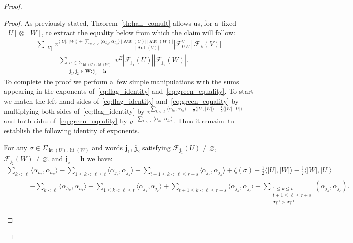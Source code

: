 \begin{proof}
\begin{proof}
As previously stated, Theorem~\ref{th:hall_comult} allows us, for a~f\/ixed $[U]\otimes[W]$, to extract the equality below
from which the claim will follow:
\begin{gather}
\sum\limits_{[V]}v^{\langle|U|,|W|\rangle+\sum\limits_{k<\ell}\langle\alpha_{h_k},\alpha_{h_\ell}\rangle}
\frac{|\operatorname{Aut}(U)||\operatorname{Aut}(W)|}{|\operatorname{Aut}(V)|}|\mathcal{F}^V_{UW}||\mathcal{F}_\mathbf{h}(V)|
\nonumber
\\
\qquad
=\sum\limits_{\substack{\sigma\in\Sigma_{\operatorname{ht}(U),\operatorname{ht}(W)}\\
\mathbf{j}_1,\mathbf{j}_2\in\mathbf{W}: \mathbf{j}_\sigma=\mathbf{h}}}
v^E|\mathcal{F}_{\mathbf{j}_1}(U)||\mathcal{F}_{\mathbf{j}_2}(W)|.
\label{eq:green_equality}
\end{gather}
To complete the proof we perform a~few simple manipulations with the sums appearing in the exponents
of~\eqref{eq:flag_identity} and~\eqref{eq:green_equality}.
To start we match the left hand sides of~\eqref{eq:flag_identity} and~\eqref{eq:green_equality} by multiplying both
sides of~\eqref{eq:flag_identity} by $v^{\sum\limits_{k<\ell}\langle
\alpha_{h_\ell},\alpha_{h_k}\rangle-\frac{1}{2}\langle |U|,|W|\rangle-\frac{1}{2}\langle |W|,|U|\rangle}$ and both sides
of~\eqref{eq:green_equality} by $v^{-\sum\limits_{k<\ell}\langle \alpha_{h_k},\alpha_{h_\ell}\rangle}$.
Thus it remains to establish the following identity of exponents.
\begin{Lemma}
\label{lem:exp_equality}
For any $\sigma\in\Sigma_{\operatorname{ht}(U),\operatorname{ht}(W)}$ and words $\mathbf{j}_1$, $\mathbf{j}_2$ satisfying
$\mathcal{F}_{\mathbf{j}_1}(U)\ne\varnothing$, $\mathcal{F}_{\mathbf{j}_2}(W)\ne\varnothing$, and
$\mathbf{j}_\sigma=\mathbf{h}$ we have:
\begin{gather}
\nonumber
\sum\limits_{k<\ell}\langle \alpha_{h_\ell},\alpha_{h_k}\rangle
-\!\sum\limits_{1\le k<\ell\le t}\!\!\langle\alpha_{j_\ell},\alpha_{j_k}\rangle
-\!\sum\limits_{t+1\le k<\ell\le r+s}\!\!\langle\alpha_{j_\ell},\alpha_{j_k}\rangle
+\zeta(\sigma)-\frac{1}{2}\langle |U|,|W|\rangle-\frac{1}{2}\langle|W|,|U|\rangle
\nonumber
\\
\qquad
=-\sum\limits_{k<\ell}\langle \alpha_{h_k},\alpha_{h_\ell}\rangle+\sum\limits_{1\le k<\ell\le t}\!\!\langle\alpha_{j_k},\alpha_{j_\ell}\rangle
+\sum\limits_{t+1\le k<\ell\le r+s}\!\!\!\!\langle\alpha_{j_k},\alpha_{j_\ell}\rangle
+\!\!\!\sum\limits_{\substack{1\le k\le t\\t+1\le\ell\le r+s\\ \sigma_k^{-1}>\sigma_\ell^{-1}}}\!\!\!\!(\alpha_{j_k},\alpha_{j_\ell}). %
\label{eq:exp_equality}
\end{gather}
\end{Lemma}


\end{proof}
\end{proof}
